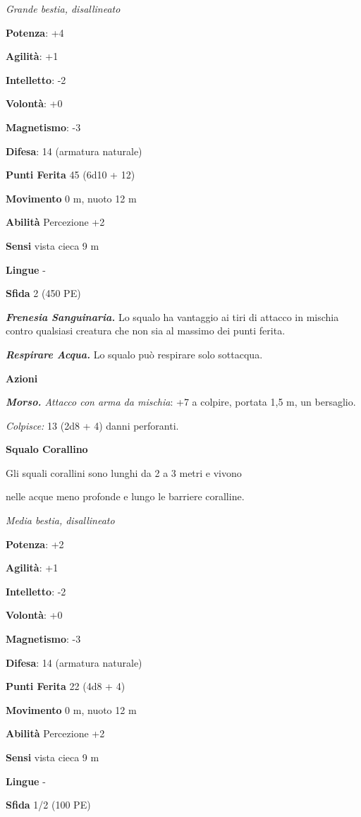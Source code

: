 \begin{multicols}{2}
\emph{Grande bestia, disallineato}

\textbf{Potenza}: +4

\textbf{Agilità}: +1

\textbf{Intelletto}: -2

\textbf{Volontà}: +0

\textbf{Magnetismo}: -3

\textbf{Difesa}: 14 (armatura naturale)

\textbf{Punti Ferita} 45 (6d10 + 12)

\textbf{Movimento} 0 m, nuoto 12 m

\textbf{Abilità} Percezione +2

\textbf{Sensi} vista cieca 9 m

\textbf{Lingue} -

\textbf{Sfida} 2 (450 PE)

\emph{\textbf{Frenesia Sanguinaria.}} Lo squalo ha vantaggio ai tiri di
attacco in mischia contro qualsiasi creatura che non sia al massimo dei
punti ferita.

\emph{\textbf{Respirare Acqua.}} Lo squalo può respirare solo sottacqua.

\textbf{Azioni}

\emph{\textbf{Morso.} Attacco con arma da mischia}: +7 a colpire,
portata 1,5 m, un bersaglio.

\emph{Colpisce:} 13 (2d8 + 4) danni perforanti.

\textbf{Squalo Corallino}

Gli squali corallini sono lunghi da 2 a 3 metri e vivono

nelle acque meno profonde e lungo le barriere coralline.

\emph{Media bestia, disallineato}

\textbf{Potenza}: +2

\textbf{Agilità}: +1

\textbf{Intelletto}: -2

\textbf{Volontà}: +0

\textbf{Magnetismo}: -3

\textbf{Difesa}: 14 (armatura naturale)

\textbf{Punti Ferita} 22 (4d8 + 4)

\textbf{Movimento} 0 m, nuoto 12 m

\textbf{Abilità} Percezione +2

\textbf{Sensi} vista cieca 9 m

\textbf{Lingue} -

\textbf{Sfida} 1/2 (100 PE)


\end{multicols}
